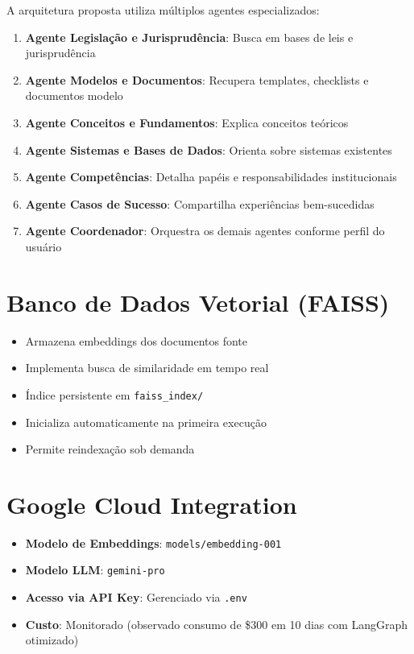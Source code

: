 \documentclass[12pt,a4paper]{report}
\begin{document}
A arquitetura proposta utiliza múltiplos agentes especializados:

\begin{enumerate}
  \item \textbf{Agente Legislação e Jurisprudência}: Busca em bases de leis e jurisprudência
  \item \textbf{Agente Modelos e Documentos}: Recupera templates, checklists e documentos modelo
  \item \textbf{Agente Conceitos e Fundamentos}: Explica conceitos teóricos
  \item \textbf{Agente Sistemas e Bases de Dados}: Orienta sobre sistemas existentes
  \item \textbf{Agente Competências}: Detalha papéis e responsabilidades institucionais
  \item \textbf{Agente Casos de Sucesso}: Compartilha experiências bem-sucedidas
  \item \textbf{Agente Coordenador}: Orquestra os demais agentes conforme perfil do usuário
\end{enumerate}

\section{Banco de Dados Vetorial (FAISS)}

\begin{itemize}
  \item Armazena embeddings dos documentos fonte
  \item Implementa busca de similaridade em tempo real
  \item Índice persistente em \texttt{faiss\_index/}
  \item Inicializa automaticamente na primeira execução
  \item Permite reindexação sob demanda
\end{itemize}

\section{Google Cloud Integration}

\begin{itemize}
  \item \textbf{Modelo de Embeddings}: \texttt{models/embedding-001}
  \item \textbf{Modelo LLM}: \texttt{gemini-pro}
  \item \textbf{Acesso via API Key}: Gerenciado via \texttt{.env}
  \item \textbf{Custo}: Monitorado (observado consumo de \$300 em 10 dias com LangGraph otimizado)
\end{itemize}
\end{document}

